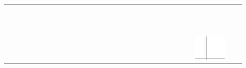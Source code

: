 \documentclass[10pt]{article}
\begin{document}
\begin{center}
\begin{tabular}{|c|c|c|c|c|c|c|c|c|c|c|c|c|c|c|c|c|c|c|c|c|c|c|c|c|c|c|c|c|c|}
\hline
 &  &  &  &  &  &  &  &  &  &  &  &  &  &  &  &  &  &  &  &  &  &  &  &  &  &  &  &  &  \\
\hline
 &  &  &  &  &  &  &  &  &  &  &  &  &  &  &  &  &  &  &  &  &  &  &  &  &  &  &  &  &  \\
\hline
 &  &  &  &  &  &  &  &  &  &  &  &  &  &  &  &  &  &  &  &  &  &  &  &  &  &  &  &  &  \\
\hline
 &  &  &  &  &  &  &  &  &  &  &  &  &  &  &  &  &  &  &  &  &  &  &  &  &  &  &  &  &  \\
\hline
 &  &  &  &  &  &  &  &  &  &  &  &  &  &  &  &  &  &  &  &  &  &  &  &  &  &  &  &  &  \\
\hline
 &  &  &  &  &  &  &  &  &  &  &  &  &  &  &  &  &  &  &  &  &  &  &  &  &  &  &  &  &  \\
\hline
 &  &  &  &  &  &  &  &  &  &  &  &  &  &  &  &  &  &  &  &  &  &  &  &  &  &  &  &  &  \\
\hline
 &  &  &  &  &  &  &  &  &  &  &  &  &  &  &  &  &  &  &  &  &  &  &  &  &  &  &  &  &  \\
\hline
 &  &  &  &  &  &  &  &  &  &  &  &  &  &  &  &  &  &  &  &  &  &  &  &  &  &  &  &  &  \\
\hline
 &  &  &  &  &  &  &  &  &  &  &  &  &  &  &  &  &  &  &  &  &  &  &  &  &  &  &  &  &  \\
\hline
 &  &  &  &  &  &  &  &  &  &  &  &  &  &  &  &  &  &  &  &  &  &  &  &  &  &  &  &  &  \\
\hline
 &  &  &  &  &  &  &  &  &  &  &  &  &  &  &  &  &  &  &  &  &  &  &  &  &  &  &  &  &  \\
\hline
 &  &  &  &  &  &  &  &  &  &  &  &  &  &  &  &  &  &  &  &  &  &  &  &  &  &  &  &  &  \\
\hline
 &  &  &  &  &  &  &  &  &  &  &  &  &  &  &  &  &  &  &  &  &  &  &  &  &  &  & \includegraphics[max width=\textwidth]{2024_11_21_2f72fc0c2faed8928619g-16}

\end{tabular}
\end{center}
\end{document}
